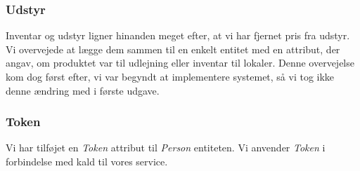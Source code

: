 \subsubsection{Udstyr}
\label{Technical_Database_changes_ie}
Inventar og udstyr ligner hinanden meget efter, at vi har fjernet pris fra udstyr. Vi overvejede at lægge dem sammen til en enkelt entitet med en attribut, der angav, om produktet var til udlejning eller inventar til lokaler. Denne overvejelse kom dog først efter, vi var begyndt at implementere systemet, så vi tog ikke denne ændring med i første udgave.

\subsubsection{Token}
\label{Technical_Database_changes_token}
Vi har tilføjet en \textit{Token} attribut til \textit{Person} entiteten. Vi anvender \textit{Token} i forbindelse med kald til vores service.